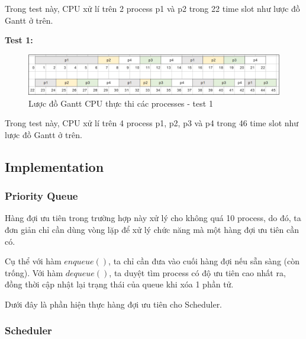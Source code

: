 \vspace{0.5cm}

Trong test này, CPU xử lí trên 2 process p1 và p2 trong 22 time slot như lược đồ Gantt ở trên.


\vspace{0.5cm}

\textbf{Test 1:}

\vspace{0.5cm}

\begin{figure}[tph]
	\centering
	\includegraphics[width=15cm]{Images/sched1.png}
	\vspace{0.5cm}
	\caption{Lược đồ Gantt CPU thực thi các processes - test 1}
	\label{fig:schedtest1}
\end{figure}

\vspace{0.5cm}

Trong test này, CPU xử lí trên 4 process p1, p2, p3 và p4 trong 46 time slot như lược đồ Gantt ở trên.


\vspace{0.5cm}

\subsection{Implementation}
\subsubsection{Priority Queue}

Hàng đợi ưu tiên trong trường hợp này xử lý cho không quá 10 process, do đó, ta đơn giản chỉ cần dùng vòng lặp để xử lý chức năng mà một hàng đợi ưu tiên cần có.

Cụ thể với hàm  $ enqueue() $, ta chỉ cần đưa vào cuối hàng đợi nếu sẵn sàng (còn trống). Với hàm $ dequeue() $, ta duyệt tìm process có độ ưu tiên cao nhất ra, đồng thời cập nhật lại trạng thái của queue khi xóa 1 phần tử.

Dưới đây là phần hiện thực hàng đợi ưu tiên cho Scheduler.




\subsubsection{Scheduler}

